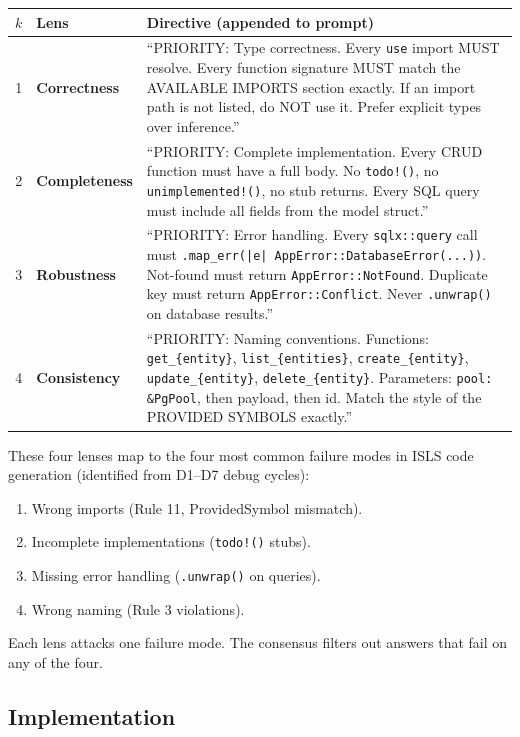 \documentclass[11pt,a4paper]{article}
\begin{document}
\begin{longtable}{clp{7cm}}
\toprule
\textbf{$k$} & \textbf{Lens} & \textbf{Directive (appended to prompt)} \\
\midrule
1 & \textbf{Correctness}
  & ``PRIORITY: Type correctness. Every \texttt{use} import MUST 
    resolve. Every function signature MUST match the AVAILABLE 
    IMPORTS section exactly. If an import path is not listed, 
    do NOT use it. Prefer explicit types over inference.'' \\
2 & \textbf{Completeness}
  & ``PRIORITY: Complete implementation. Every CRUD function must 
    have a full body. No \texttt{todo!()}, no \texttt{unimplemented!()}, 
    no stub returns. Every SQL query must include all fields from 
    the model struct.'' \\
3 & \textbf{Robustness}
  & ``PRIORITY: Error handling. Every \texttt{sqlx::query} call 
    must \texttt{.map\_err(|e| AppError::DatabaseError(...))}. 
    Not-found must return \texttt{AppError::NotFound}. Duplicate 
    key must return \texttt{AppError::Conflict}. Never 
    \texttt{.unwrap()} on database results.'' \\
4 & \textbf{Consistency}
  & ``PRIORITY: Naming conventions. Functions: 
    \texttt{get\_\{entity\}}, \texttt{list\_\{entities\}}, 
    \texttt{create\_\{entity\}}, \texttt{update\_\{entity\}}, 
    \texttt{delete\_\{entity\}}. Parameters: 
    \texttt{pool: \&PgPool}, then payload, then id. Match the 
    style of the PROVIDED SYMBOLS exactly.'' \\
\bottomrule
\end{longtable}

These four lenses map to the four most common failure modes 
in ISLS code generation (identified from D1--D7 debug cycles):

\begin{enumerate}[nosep]
\item Wrong imports (Rule 11, ProvidedSymbol mismatch).
\item Incomplete implementations (\texttt{todo!()} stubs).
\item Missing error handling (\texttt{.unwrap()} on queries).
\item Wrong naming (Rule 3 violations).
\end{enumerate}

Each lens attacks one failure mode. The consensus filters out 
answers that fail on any of the four.

\subsection{Implementation}
\end{document}
